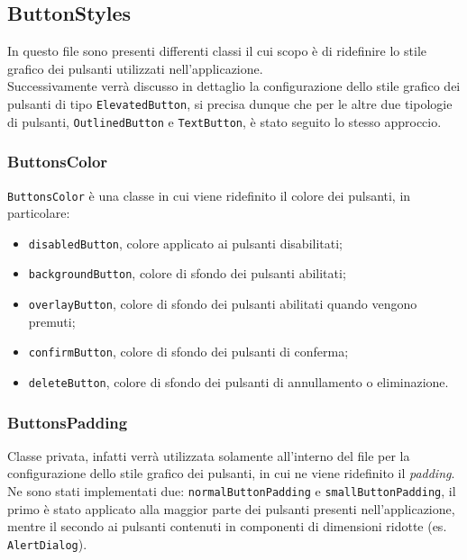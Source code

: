 \subsection{ButtonStyles}
\label{subsec:button-styles}

In questo file sono presenti differenti classi il cui scopo è di ridefinire lo stile grafico dei pulsanti utilizzati nell'applicazione. \\
Successivamente verrà discusso in dettaglio la configurazione dello stile grafico dei pulsanti di tipo \lstinline{ElevatedButton}\cite{site:elevated-button}, si precisa dunque che per le altre due tipologie di pulsanti, \lstinline{OutlinedButton}\cite{site:outline-button} e \lstinline{TextButton}\cite{site:text-button}, è stato seguito lo stesso approccio.

\subsubsection*{ButtonsColor}
\label{subsubsec:button-color}

\lstinline{ButtonsColor} è una classe in cui viene ridefinito il colore dei pulsanti, in particolare:
\begin{itemize}
    \item \lstinline{disabledButton}, colore applicato ai pulsanti disabilitati;
    \item \lstinline{backgroundButton}, colore di sfondo dei pulsanti abilitati;
    \item \lstinline{overlayButton}, colore di sfondo dei pulsanti abilitati quando vengono premuti;
    \item \lstinline{confirmButton}, colore di sfondo dei pulsanti di conferma;
    \item \lstinline{deleteButton}, colore di sfondo dei pulsanti di annullamento o eliminazione.
\end{itemize}

\subsubsection*{ButtonsPadding}
\label{subsubsec:button-padding}

Classe privata, infatti verrà utilizzata solamente all'interno del file per la configurazione dello stile grafico dei pulsanti, in cui ne viene ridefinito il \emph{padding}\cite{site:padding}. \\
Ne sono stati implementati due: \lstinline{normalButtonPadding} e \lstinline{smallButtonPadding}, il primo è stato applicato alla maggior parte dei pulsanti presenti nell'applicazione, mentre il secondo ai pulsanti contenuti in componenti di dimensioni ridotte (es. \lstinline{AlertDialog}).

